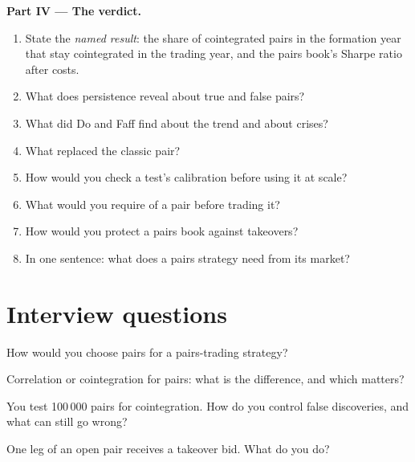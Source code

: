 \begin{problem}
\medskip\noindent\textbf{Part IV --- The verdict.}
\begin{enumerate}[resume]
\item State the \emph{named result}: the share of cointegrated pairs in the formation year that stay cointegrated in the trading year, and the pairs book's
Sharpe ratio after costs.
\item What does persistence reveal about true and false pairs?
\item What did Do and Faff find about the trend and about crises?
\item What replaced the classic pair?
\item How would you check a test's calibration before using it at scale?
\item What would you require of a pair before trading it?
\item How would you protect a pairs book against takeovers?
\item In one sentence: what does a pairs strategy need from its market?
\end{enumerate}
\end{problem}

\section{Interview questions}

\begin{interviewq}\label{iq:s1:pairs-and-baskets:1}
How would you choose pairs for a pairs-trading strategy?
\end{interviewq}

\begin{interviewq}\label{iq:s1:pairs-and-baskets:2}
Correlation or cointegration for pairs: what is the difference, and which matters?
\end{interviewq}

\begin{interviewq}\label{iq:s1:pairs-and-baskets:3}
You test 100\,000 pairs for cointegration. How do you control false discoveries, and what can still go wrong?
\end{interviewq}

\begin{interviewq}\label{iq:s1:pairs-and-baskets:4}
One leg of an open pair receives a takeover bid. What do you do?
\end{interviewq}

